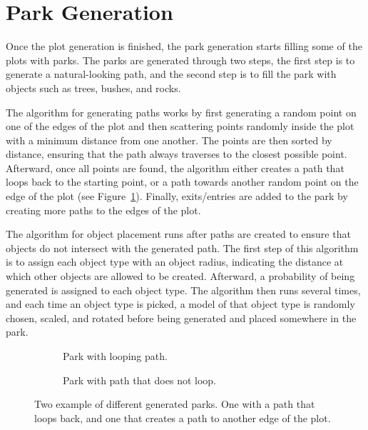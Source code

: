 \section{Park Generation}

Once the plot generation is finished, the park generation starts filling some of the plots with parks.
The parks are generated through two steps, the first step is to generate a natural-looking path, and the second step is to fill the park with objects such as trees, bushes, and rocks.

The algorithm for generating paths works by first generating a random point on one of the edges of the plot and then scattering points randomly inside the plot with a minimum distance from one another.
The points are then sorted by distance, ensuring that the path always traverses to the closest possible point.
Afterward, once all points are found, the algorithm either creates a path that loops back to the starting point, or a path towards another random point on the edge of the plot (see Figure~\ref{fig:parks}).
Finally, exits/entries are added to the park by creating more paths to the edges of the plot.

The algorithm for object placement runs after paths are created to ensure that objects do not intersect with the generated path.
The first step of this algorithm is to assign each object type with an object radius, indicating the distance at which other objects are allowed to be created.
Afterward, a probability of being generated is assigned to each object type.
The algorithm then runs several times, and each time an object type is picked, a model of that object type is randomly chosen, scaled, and rotated before being generated and placed somewhere in the park.

\begin{figure}[H]
  \centering
  \begin{subfigure}[b]{0.48\textwidth}
    \caption{Park with looping path.}
  \end{subfigure}
  \quad
  \begin{subfigure}[b]{0.48\textwidth}
    \caption{Park with path that does not loop.}
  \end{subfigure}
  \caption{Two example of different generated parks. One with a path that loops back, and one that creates a path to another edge of the plot.}
  \label{fig:parks}
\end{figure}

